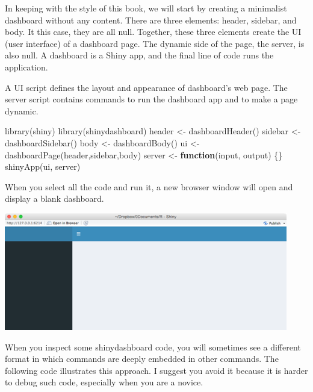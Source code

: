 \documentclass[
]{article}
\newenvironment{Shaded}{\begin{snugshade}}{\end{snugshade}}
\newcommand{\ControlFlowTok}[1]{\textcolor[rgb]{0.13,0.29,0.53}{\textbf{#1}}}
\newcommand{\FunctionTok}[1]{\textcolor[rgb]{0.00,0.00,0.00}{#1}}
\newcommand{\NormalTok}[1]{#1}
\newcommand{\OtherTok}[1]{\textcolor[rgb]{0.56,0.35,0.01}{#1}}
\begin{document}
In keeping with the style of this book, we will start by creating a
minimalist dashboard without any content. There are three elements:
header, sidebar, and body. It this case, they are all null. Together,
these three elements create the UI (user interface) of a dashboard page.
The dynamic side of the page, the server, is also null. A dashboard is a
Shiny app, and the final line of code runs the application.

A UI script defines the layout and appearance of dashboard's web page.
The server script contains commands to run the dashboard app and to make
a page dynamic.

\begin{Shaded}
\begin{Highlighting}[]
\FunctionTok{library}\NormalTok{(shiny)}
\FunctionTok{library}\NormalTok{(shinydashboard)}
\NormalTok{header }\OtherTok{\textless{}{-}} \FunctionTok{dashboardHeader}\NormalTok{()}
\NormalTok{sidebar }\OtherTok{\textless{}{-}} \FunctionTok{dashboardSidebar}\NormalTok{()}
\NormalTok{body }\OtherTok{\textless{}{-}} \FunctionTok{dashboardBody}\NormalTok{()}
\NormalTok{ui }\OtherTok{\textless{}{-}} \FunctionTok{dashboardPage}\NormalTok{(header,sidebar,body)}
\NormalTok{server }\OtherTok{\textless{}{-}} \ControlFlowTok{function}\NormalTok{(input, output) \{\}}
\FunctionTok{shinyApp}\NormalTok{(ui, server)}
\end{Highlighting}
\end{Shaded}

When you select all the code and run it, a new browser window will open
and display a blank dashboard.

\includegraphics{Figures/Chapter 19/dashboard-1.png}

When you inspect some shinydashboard code, you will sometimes see a
different format in which commands are deeply embedded in other
commands. The following code illustrates this approach. I suggest you
avoid it because it is harder to debug such code, especially when you
are a novice.
\end{document}
